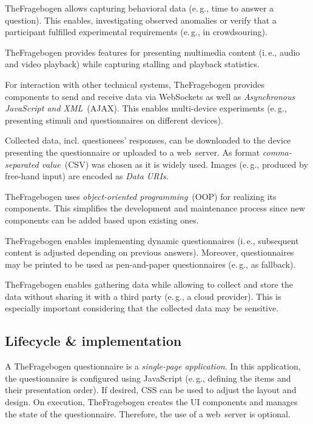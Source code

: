 \documentclass[conference,a4paper]{IEEEtran}
\newcommand{\ie}{i.\,e.}
\newcommand{\eg}{e.\,g.}
\begin{document}
TheFragebogen allows  capturing behavioral data (\eg, time to answer a question).
This enables, investigating observed anomalies or verify that a participant fulfilled experimental requirements (\eg, in crowdsouring).

TheFragebogen provides features for presenting multimedia content (\ie, audio and video playback) while capturing stalling and playback statistics.

For interaction with other technical systems, TheFragebogen provides components to send and receive data via WebSockets as well as \emph{Asynchronous JavaScript and XML}~(AJAX).
This enables multi-device experiments (\eg, presenting stimuli and questionnaires on different devices).

Collected data, incl. questionees' responses, can be downloaded to the device presenting the questionnaire or uploaded to a web~server.
As format \emph{comma-separated value}~(CSV) was chosen as it is widely used.
Images (\eg, produced by free-hand input) are encoded as \emph{Data URIs}.

TheFragebogen uses \emph{object-oriented programming}~(OOP) for realizing its components.
This simplifies the development and maintenance process since new components can be added based upon existing ones.

TheFragebogen enables implementing dynamic questionnaires (\ie, subsequent content is adjusted depending on previous answers).
Moreover, questionnaires may be printed to be used as pen-and-paper questionnaires (\eg, as fallback).

TheFragebogen enables gathering data while allowing to collect and store the data without sharing it with a third party (\eg, a cloud provider).
This is especially important considering that the collected data may be sensitive.

\subsection{Lifecycle \& implementation}
A TheFragebogen questionnaire is a \emph{single-page application}.
In this application, the questionnaire is configured using JavaScript (\eg, defining the items and their presentation order).
If desired, CSS can be used to adjust the layout and design.
On execution, TheFragebogen creates the UI components and manages the state of the questionnaire.
Therefore, the use of a web~server is optional.
\end{document}
